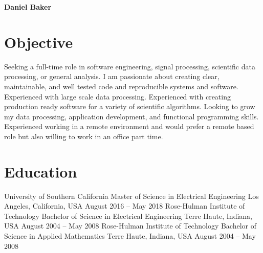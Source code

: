 



\textbf{\Huge Daniel Baker}
\begin{profile}
\end{profile}

\section{Objective}

\begin{blockquote}
    Seeking a full-time role in software engineering, signal processing, scientific data processing, or general analysis.
    I am passionate about creating clear, maintainable, and well tested code and reproducible systems and software.
    Experienced with large scale data processing.
    Experienced with creating production ready software for a variety of scientific algorithms.
    Looking to grow my data processing, application development, and functional programming skills.
    Experienced working in a remote environment and would prefer a remote based role but also willing to work in an office part time.
\end{blockquote}

\section{Education}

\begin{education}
    \educationInfo
        {University of Southern California}
        {Master of Science in Electrical Engineering}
        {Los Angeles, California, USA}
        {August 2016 -- May 2018}
    \educationInfo
        {Rose-Hulman Institute of Technology}
        {Bachelor of Science in Electrical Engineering}
        {Terre Haute, Indiana, USA}
        {August 2004 -- May 2008}
    \educationInfo
        {Rose-Hulman Institute of Technology}
        {Bachelor of Science in Applied Mathematics}
        {Terre Haute, Indiana, USA}
        {August 2004 -- May 2008}
\end{education}


